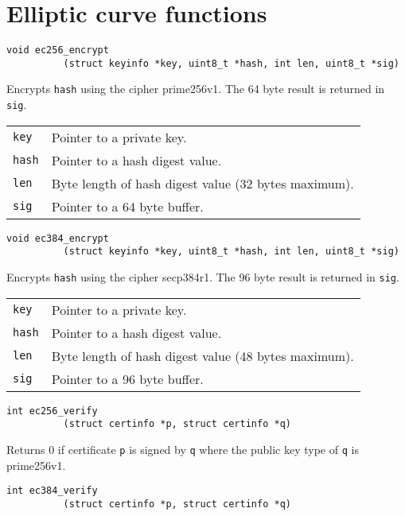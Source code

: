 \documentclass[12pt]{article}
\begin{document}
\section{Elliptic curve functions}

\bigskip
\bigskip
\begin{verbatim}
void ec256_encrypt
          (struct keyinfo *key, uint8_t *hash, int len, uint8_t *sig)
\end{verbatim}

\noindent
Encrypts {\tt hash} using the cipher prime256v1.
The 64 byte result is returned in {\tt sig}.

\bigskip
\begin{tabular}{ll}
{\tt key} & Pointer to a private key.\\
{\tt hash} & Pointer to a hash digest value.\\
{\tt len} & Byte length of hash digest value (32 bytes maximum).\\
{\tt sig} & Pointer to a 64 byte buffer.
\end{tabular}

\bigskip
\bigskip
\begin{verbatim}
void ec384_encrypt
          (struct keyinfo *key, uint8_t *hash, int len, uint8_t *sig)
\end{verbatim}

\noindent
Encrypts {\tt hash} using the cipher secp384r1.
The 96 byte result is returned in {\tt sig}.

\bigskip
\begin{tabular}{ll}
{\tt key} & Pointer to a private key.\\
{\tt hash} & Pointer to a hash digest value.\\
{\tt len} & Byte length of hash digest value (48 bytes maximum).\\
{\tt sig} & Pointer to a 96 byte buffer.
\end{tabular}

\bigskip
\bigskip
\begin{verbatim}
int ec256_verify
          (struct certinfo *p, struct certinfo *q)
\end{verbatim}

\noindent
Returns 0 if certificate {\tt p} is signed by {\tt q}
where the public key type of {\tt q} is prime256v1.

\bigskip
\bigskip
\begin{verbatim}
int ec384_verify
          (struct certinfo *p, struct certinfo *q)
\end{verbatim}
\end{document}

